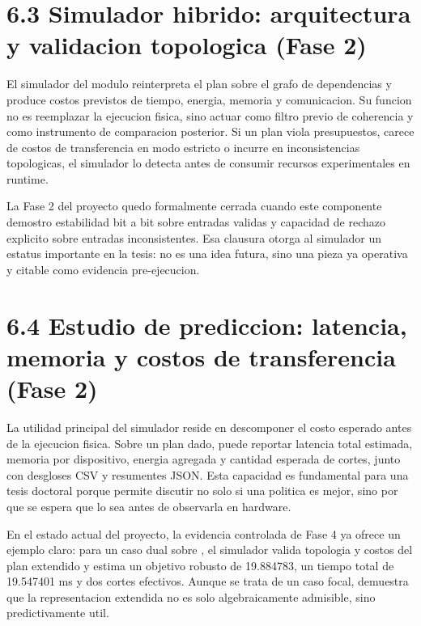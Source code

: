 \section{6.3 Simulador hibrido: arquitectura y validacion topologica (Fase 2)}
El simulador del modulo  reinterpreta el plan sobre el grafo de dependencias y produce costos previstos de tiempo, energia, memoria y comunicacion. Su funcion no es reemplazar la ejecucion fisica, sino actuar como filtro previo de coherencia y como instrumento de comparacion posterior. Si un plan viola presupuestos, carece de costos de transferencia en modo estricto o incurre en inconsistencias topologicas, el simulador lo detecta antes de consumir recursos experimentales en runtime.

La Fase 2 del proyecto quedo formalmente cerrada cuando este componente demostro estabilidad bit a bit sobre entradas validas y capacidad de rechazo explicito sobre entradas inconsistentes. Esa clausura otorga al simulador un estatus importante en la tesis: no es una idea futura, sino una pieza ya operativa y citable como evidencia pre-ejecucion.

\section{6.4 Estudio de prediccion: latencia, memoria y costos de transferencia (Fase 2)}
La utilidad principal del simulador reside en descomponer el costo esperado antes de la ejecucion fisica. Sobre un plan dado, puede reportar latencia total estimada, memoria por dispositivo, energia agregada y cantidad esperada de cortes, junto con desgloses CSV y resumentes JSON. Esta capacidad es fundamental para una tesis doctoral porque permite discutir no solo si una politica es mejor, sino por que se espera que lo sea antes de observarla en hardware.

En el estado actual del proyecto, la evidencia controlada de Fase 4 ya ofrece un ejemplo claro: para un caso dual sobre , el simulador valida topologia y costos del plan extendido y estima un objetivo robusto de 19.884783, un tiempo total de 19.547401 ms y dos cortes efectivos. Aunque se trata de un caso focal, demuestra que la representacion extendida no es solo algebraicamente admisible, sino predictivamente util.

